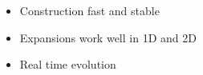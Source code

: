 \begin{frame}
    \begin{itemize}
        \item Construction fast and stable
        \item Expansions work well in 1D and 2D
        \item Real time evolution
    \end{itemize}
\end{frame}